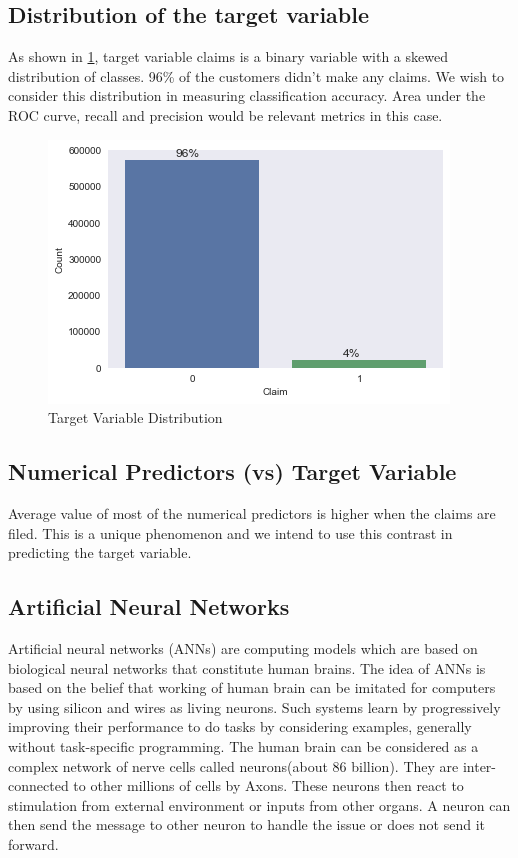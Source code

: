 \subsection{Distribution of the target variable}
As shown in \ref{f:numerical}, target variable claims is a binary variable with a skewed distribution of classes. 96\% of the customers didn't make any claims. We wish to consider this distribution in measuring classification accuracy. Area under the ROC curve, recall and precision would be relevant metrics in this case.
 
\begin{figure}
 \centering\includegraphics[width=\columnwidth]{images/target}
 \caption{Target Variable Distribution}\label{f:numerical}
\end{figure}

\subsection{Numerical Predictors (vs) Target Variable}

 Average value of most of the numerical predictors is higher when the claims are filed. This is a unique phenomenon and we intend to use this contrast in predicting the target variable.
  
\subsection{Artificial Neural Networks}

Artificial neural networks (ANNs)  are computing models which are based on biological neural networks that constitute human brains. The idea of ANNs is based on the belief that working of human brain can be imitated for computers by using silicon and wires as living neurons. Such systems learn by progressively improving their performance to do tasks by considering examples, generally without task-specific programming. The human brain can be considered as a complex network of nerve cells called neurons(about 86 billion). They are inter-connected to other millions of cells by Axons. These neurons then react to stimulation from external environment or inputs from other organs. A neuron can then send the message to other neuron to handle the issue or does not send it forward. 

